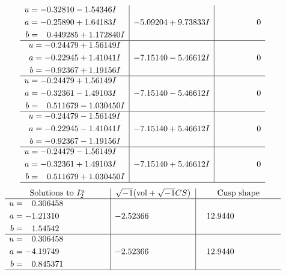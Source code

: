 \documentclass[1p]{elsarticle_modified}
\theoremstyle{definition}
\newcommand{\I}{\sqrt{-1}}
\begin{document}
$$\begin{array}{c|c|c}
\begin{aligned}
u &= -0.32810 - 1.54346 I \\
a &= -0.25890 + 1.64183 I \\
b &= \phantom{-}0.449285 + 1.172840 I\end{aligned}
 & -5.09204 + 9.73833 I & \phantom{-0.000000 } 0 \\ \hline\begin{aligned}
u &= -0.24479 + 1.56149 I \\
a &= -0.22945 + 1.41041 I \\
b &= -0.92367 + 1.19156 I\end{aligned}
 & -7.15140 - 5.46612 I & \phantom{-0.000000 } 0 \\ \hline\begin{aligned}
u &= -0.24479 + 1.56149 I \\
a &= -0.32361 - 1.49103 I \\
b &= \phantom{-}0.511679 - 1.030450 I\end{aligned}
 & -7.15140 - 5.46612 I & \phantom{-0.000000 } 0 \\ \hline\begin{aligned}
u &= -0.24479 - 1.56149 I \\
a &= -0.22945 - 1.41041 I \\
b &= -0.92367 - 1.19156 I\end{aligned}
 & -7.15140 + 5.46612 I & \phantom{-0.000000 } 0 \\ \hline\begin{aligned}
u &= -0.24479 - 1.56149 I \\
a &= -0.32361 + 1.49103 I \\
b &= \phantom{-}0.511679 + 1.030450 I\end{aligned}
 & -7.15140 + 5.46612 I & \phantom{-0.000000 } 0\\
 \hline 
 \end{array}$$\newpage$$\begin{array}{c|c|c}  
\text{Solutions to }I^u_{2}& \I (\text{vol} + \sqrt{-1}CS) & \text{Cusp shape}\\
 \hline 
\begin{aligned}
u &= \phantom{-}0.306458\phantom{ +0.000000I} \\
a &= -1.21310\phantom{ +0.000000I} \\
b &= \phantom{-}1.54542\phantom{ +0.000000I}\end{aligned}
 & -2.52366\phantom{ +0.000000I} & \phantom{-}12.9440\phantom{ +0.000000I} \\ \hline\begin{aligned}
u &= \phantom{-}0.306458\phantom{ +0.000000I} \\
a &= -4.19749\phantom{ +0.000000I} \\
b &= \phantom{-}0.845371\phantom{ +0.000000I}\end{aligned}
 & -2.52366\phantom{ +0.000000I} & \phantom{-}12.9440\phantom{ +0.000000I}\\
 \hline 
 \end{array}$$\newpage\newpage\renewcommand{\arraystretch}{1}
\end{document}
